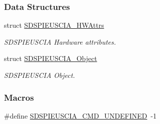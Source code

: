 \subsubsection*{Data Structures}
\begin{DoxyCompactItemize}
\item 
struct \hyperlink{struct_s_d_s_p_i_e_u_s_c_i_a___h_w_attrs}{S\-D\-S\-P\-I\-E\-U\-S\-C\-I\-A\-\_\-\-H\-W\-Attrs}
\begin{DoxyCompactList}\small\item\em S\-D\-S\-P\-I\-E\-U\-S\-C\-I\-A Hardware attributes. \end{DoxyCompactList}\item 
struct \hyperlink{struct_s_d_s_p_i_e_u_s_c_i_a___object}{S\-D\-S\-P\-I\-E\-U\-S\-C\-I\-A\-\_\-\-Object}
\begin{DoxyCompactList}\small\item\em S\-D\-S\-P\-I\-E\-U\-S\-C\-I\-A Object. \end{DoxyCompactList}\end{DoxyCompactItemize}
\subsubsection*{Macros}
\begin{DoxyCompactItemize}
\item 
\#define \hyperlink{_s_d_s_p_i_e_u_s_c_i_a_8h_a42562a678c278671ffa3246d0952ad70}{S\-D\-S\-P\-I\-E\-U\-S\-C\-I\-A\-\_\-\-C\-M\-D\-\_\-\-U\-N\-D\-E\-F\-I\-N\-E\-D}~-\/1
\end{DoxyCompactItemize}
